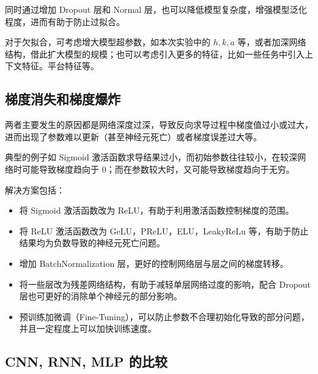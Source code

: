 \documentclass[a4paper]{article}
\begin{document}
    同时通过增加 Dropout 层和 Normal 层，也可以降低模型复杂度，增强模型泛化程度，进而有助于防止过拟合。

    对于欠拟合，可考虑增大模型超参数，如本次实验中的 $h, k, a$ 等，或者加深网络结构，借此扩大模型的规模；也可以考虑引入更多的特征，比如一些任务中引入上下文特征。平台特征等。

    \subsection{梯度消失和梯度爆炸}

    两者主要发生的原因都是网络深度过深，导致反向求导过程中梯度值过小或过大，进而出现了参数难以更新（甚至神经元死亡）或者梯度误差过大等。

    典型的例子如 Sigmoid 激活函数求导结果过小，而初始参数往往较小，在较深网络时可能导致梯度趋向于 $0$；而在参数较大时，又可能导致梯度趋向于无穷。

    解决方案包括：
    \begin{itemize}
        \item 将 Sigmoid 激活函数改为 ReLU，有助于利用激活函数控制梯度的范围。
        \item 将 ReLU 激活函数改为 GeLU，PReLU，ELU，LeakyReLu 等，有助于防止结果均为负数导致的神经元死亡问题。
        \item 增加 BatchNormalization 层，更好的控制网络层与层之间的梯度转移。
        \item 将一些层改为残差网络结构，有助于减轻单层网络过度的影响，配合 Dropout 层也可更好的消除单个神经元的部分影响。
        \item 预训练加微调（Fine-Tuning），可以防止参数不合理初始化导致的部分问题，并且一定程度上可以加快训练速度。
    \end{itemize}

    \subsection{CNN, RNN, MLP 的比较}
\end{document}
